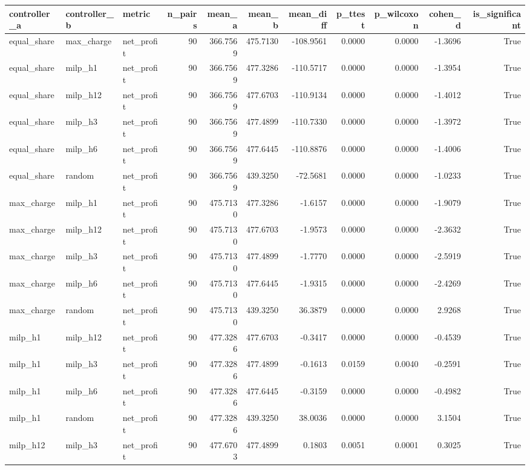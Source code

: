 \begin{tabular}{lllrrrrrrrr}
\toprule
controller_a & controller_b & metric & n_pairs & mean_a & mean_b & mean_diff & p_ttest & p_wilcoxon & cohen_d & is_significant \\
\midrule
equal_share & max_charge & net_profit & 90 & 366.7569 & 475.7130 & -108.9561 & 0.0000 & 0.0000 & -1.3696 & True \\
equal_share & milp_h1 & net_profit & 90 & 366.7569 & 477.3286 & -110.5717 & 0.0000 & 0.0000 & -1.3954 & True \\
equal_share & milp_h12 & net_profit & 90 & 366.7569 & 477.6703 & -110.9134 & 0.0000 & 0.0000 & -1.4012 & True \\
equal_share & milp_h3 & net_profit & 90 & 366.7569 & 477.4899 & -110.7330 & 0.0000 & 0.0000 & -1.3972 & True \\
equal_share & milp_h6 & net_profit & 90 & 366.7569 & 477.6445 & -110.8876 & 0.0000 & 0.0000 & -1.4006 & True \\
equal_share & random & net_profit & 90 & 366.7569 & 439.3250 & -72.5681 & 0.0000 & 0.0000 & -1.0233 & True \\
max_charge & milp_h1 & net_profit & 90 & 475.7130 & 477.3286 & -1.6157 & 0.0000 & 0.0000 & -1.9079 & True \\
max_charge & milp_h12 & net_profit & 90 & 475.7130 & 477.6703 & -1.9573 & 0.0000 & 0.0000 & -2.3632 & True \\
max_charge & milp_h3 & net_profit & 90 & 475.7130 & 477.4899 & -1.7770 & 0.0000 & 0.0000 & -2.5919 & True \\
max_charge & milp_h6 & net_profit & 90 & 475.7130 & 477.6445 & -1.9315 & 0.0000 & 0.0000 & -2.4269 & True \\
max_charge & random & net_profit & 90 & 475.7130 & 439.3250 & 36.3879 & 0.0000 & 0.0000 & 2.9268 & True \\
milp_h1 & milp_h12 & net_profit & 90 & 477.3286 & 477.6703 & -0.3417 & 0.0000 & 0.0000 & -0.4539 & True \\
milp_h1 & milp_h3 & net_profit & 90 & 477.3286 & 477.4899 & -0.1613 & 0.0159 & 0.0040 & -0.2591 & True \\
milp_h1 & milp_h6 & net_profit & 90 & 477.3286 & 477.6445 & -0.3159 & 0.0000 & 0.0000 & -0.4982 & True \\
milp_h1 & random & net_profit & 90 & 477.3286 & 439.3250 & 38.0036 & 0.0000 & 0.0000 & 3.1504 & True \\
milp_h12 & milp_h3 & net_profit & 90 & 477.6703 & 477.4899 & 0.1803 & 0.0051 & 0.0001 & 0.3025 & True \\

\end{tabular}
